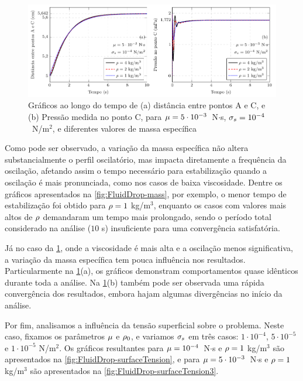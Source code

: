 \documentclass[Tese.tex]{subfiles}
\begin{document}
\begin{figure}[!htb]
	\centering
	\caption{Gráficos ao longo do tempo de (a) distância entre pontos A e C, e (b) Pressão medida no ponto C, para $\mu = 5\cdot 10^{-3}$~N$\cdot$s, $\sigma_s = 10^{-4}$~N/m$^2$, e diferentes valores de massa específica}
	\label{fig:FluidDrop-mass3}
	\includegraphics[scale=1.0]{Figuras/SurfaceTension2D/SurfaceTension2D-mass3.pdf}
\end{figure}


Como pode ser observado, a variação da massa específica não altera substancialmente o perfil oscilatório, mas impacta diretamente a frequência da oscilação, afetando assim o tempo necessário para estabilização quando a oscilação é mais pronunciada, como nos casos de baixa viscosidade. Dentre os gráficos apresentados na \cref{fig:FluidDrop-mass}, por exemplo, o menor tempo de estabilização foi obtido para $\rho = 1$ kg/m$^3$, enquanto os casos com valores mais altos de $\rho$ demandaram um tempo mais prolongado, sendo o período total considerado na análise ($10$ s) insuficiente para uma convergência satisfatória.

Já no caso da \cref{fig:FluidDrop-mass3}, onde a viscosidade é mais alta e a oscilação menos significativa, a variação da massa específica tem pouca influência nos resultados. Particularmente na \cref{fig:FluidDrop-mass3}(a), os gráficos demonstram comportamentos quase idênticos durante toda a análise. Na \cref{fig:FluidDrop-mass3}(b) também pode ser observada uma rápida convergência dos resultados, embora hajam algumas divergências no início da análise.

Por fim, analisamos a influência da tensão superficial sobre o problema. Neste caso, fixamos os parâmetros $\mu$ e $\rho_0$, e variamos $\sigma_s$ em três casos: $1\cdot 10^{-4}$, $5\cdot 10^{-5}$ e $1\cdot 10^{-5}$ N/m$^2$. Os gráficos resultantes para $\mu = 10^{-4}$~N$\cdot$s e $\rho = 1$ kg/m$^3$ são apresentados na \cref{fig:FluidDrop-surfaceTension}, e para $\mu = 5\cdot 10^{-3}$~N$\cdot$s e $\rho = 1$ kg/m$^3$ são apresentados na \cref{fig:FluidDrop-surfaceTension3}. 
\end{document}

